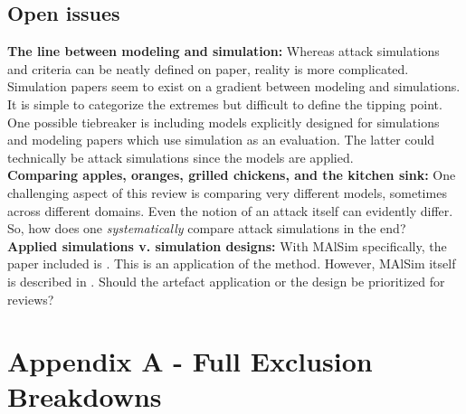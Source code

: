 \documentclass{article}
\begin{document}
\subsection{Open issues}

\textbf{The line between modeling and simulation:} Whereas attack simulations and criteria can be neatly defined on paper, reality is more complicated. Simulation papers seem to exist on a gradient between modeling and simulations. It is simple to categorize the extremes but difficult to define the tipping point. One possible tiebreaker is including models explicitly designed for simulations and modeling papers which use simulation as an evaluation. The latter could technically be attack simulations since the models are applied.\\

\noindent \textbf{Comparing apples, oranges, grilled chickens, and the kitchen sink:} One challenging aspect of this review is comparing very different models, sometimes across different domains. Even the notion of an attack itself can evidently differ. So, how does one \textit{systematically} compare attack simulations in the end?\\
        
\noindent \textbf{Applied simulations v. simulation designs:} With MAlSim specifically, the paper included is \cite{leszczyna2011}. This is an application of the method. However, MAlSim itself is described in \cite{leszczyna2010}. Should the artefact application or the design be prioritized for reviews?


\newpage
\printbibliography

\newpage
\section{Appendix A - Full Exclusion Breakdowns}
\end{document}
